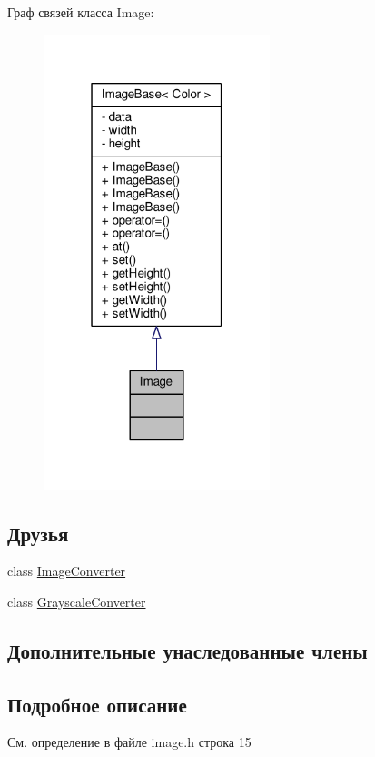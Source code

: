 Граф связей класса Image\+:
\nopagebreak
\begin{figure}[H]
\begin{center}
\leavevmode
\includegraphics[width=187pt]{d8/d41/class_image__coll__graph}
\end{center}
\end{figure}
\subsection*{Друзья}
\begin{DoxyCompactItemize}
\item 
class \hyperlink{class_image_a683b929065aaead03ccce450a7b4ab30}{Image\+Converter}
\item 
class \hyperlink{class_image_a655e20b76703bb6a4e6ecd9ed4a5d9ed}{Grayscale\+Converter}
\end{DoxyCompactItemize}
\subsection*{Дополнительные унаследованные члены}


\subsection{Подробное описание}


См. определение в файле image.\+h строка 15



